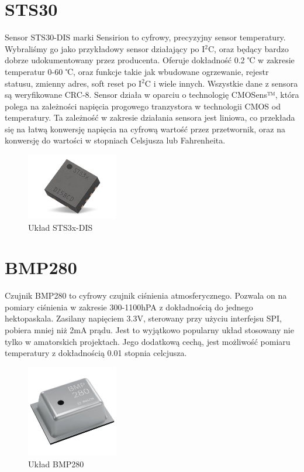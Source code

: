 \section{STS30}

Sensor STS30-DIS marki Sensirion to cyfrowy, precyzyjny sensor temperatury. Wybraliśmy go jako przykładowy sensor działający po I$^2$C, oraz będący bardzo dobrze udokumentowany przez producenta. Oferuje dokładność 0.2 ℃ w zakresie temperatur 0-60 ℃, oraz funkcje takie jak wbudowane ogrzewanie, rejestr statusu, zmienny adres, soft reset po I$^2$C i wiele innych\cite{sts_datasheet}. Wszystkie dane z sensora są weryfikowane CRC-8. Sensor działa w oparciu o technologię CMOSens™️, która polega na zależności napięcia progowego tranzystora w technologii CMOS od temperatury. Ta zależność w zakresie działania sensora jest liniowa, co przekłada się na łatwą konwersję napięcia na cyfrową wartość przez przetwornik, oraz na konwersję do wartości w stopniach Celsjusza lub Fahrenheita. 
\begin{figure}[H]
    \centering
    \includegraphics[width=4cm]{Graphics/sts_img.png}
    \caption{Układ STS3x-DIS\cite{sts_mouser}}
    \label{img:sts_mouser}
\end{figure}

\section{BMP280}

Czujnik BMP280 to cyfrowy czujnik ciśnienia atmosferycznego. Pozwala on na pomiary ciśnienia w zakresie 300-1100hPA z dokładnością do jednego hektopaskala. Zasilany napięciem 3.3V, sterowany przy użyciu interfejsu SPI, pobiera mniej niż 2mA prądu. Jest to wyjątkowo popularny układ stosowany nie tylko w amatorskich projektach. Jego dodatkową cechą, jest możliwość pomiaru temperatury z dokładnością 0.01 stopnia celcjusza\cite{bmp_datasheet}.
\begin{figure}[H]
    \centering
    \includegraphics[width=4cm]{Graphics/bmp_img.png}
    \caption{Układ BMP280\cite{bmp_mouser}}
    \label{img:bmp_mouser}
\end{figure}

